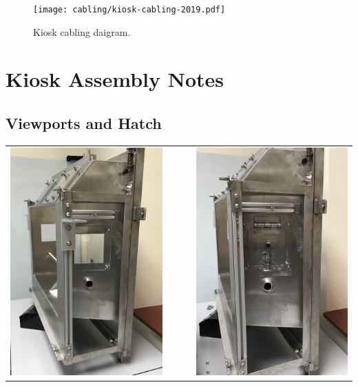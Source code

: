 \begin{figure}[h]
\texttt{[image: cabling/kiosk-cabling-2019.pdf]}
\caption{Kiosk cabling daigram.}
\label{fig-kiosk-cabling}
\end{figure}

\clearpage
\section{Kiosk Assembly Notes}
\label{sect-setup-howto}

%
%
\subsection{Viewports and Hatch}
\label{sect-setup-howto-viewports}

\begin{tabular}{ccc}
\includegraphics[width=0.4\columnwidth]
{photos/install-20181106/face-before.jpg} &
~~~ &
\includegraphics[width=0.4\columnwidth]
{photos/install-20181106/hatch.jpg} \\
\end{tabular}

